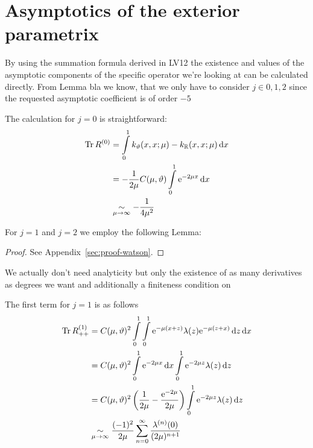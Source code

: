 \section{Asymptotics of the exterior parametrix}
By using the summation formula derived in LV12 the existence and values of the
asymptotic components of the specific operator we're looking at can be
calculated directly. From Lemma bla we know, that we only have to consider $j\in
{0, 1, 2}$ since the requested asymptotic coefficient is of order $-5$ %

The calculation for $j=0$ is straightforward:
\begin{align}
    \Tr R^{(0)} &= \Integ[1]{0}{x}{k_\theta(x,x;\mu) - k_\mathbb{R}(x,x;\mu)} \\
    &= -\frac1{2\mu} C(\mu,\theta) \Integ[1]{0}{x}{\Eto{-2\mu x}} \\
    &\SimAs{\mu\to\infty} -\frac1{4\mu^2}
    \label{eqn:jeq0}
\end{align}

For $j=1$ and $j=2$ we employ the following Lemma:
\begin{Lemma}[Watson]
    
    \begin{proof}
        See Appendix~\ref{sec:proof-watson}.
    \end{proof}
    \begin{Remark}
        We actually don't need analyticity but only the existence of as many
        derivatives as degrees we want and additionally a finiteness condition
        on
    \end{Remark}
\end{Lemma}

The first term for $j=1$ is as follows
\begin{align*}
    \Tr R^{(1)}_{++} &= C(\mu,\theta)^2
        \Integ[1]{0}{x}{
            \Integ[1]{0}{z}{\Eto{-\mu(x+z)}
                \lambda(z)\Eto{-\mu(z+x)}
            }
        }
        \\
        &= C(\mu,\theta)^2
            \Integ[1]{0}{x}{
                \Eto{-2\mu x}
            }
            \Integ[1]{0}{z}{\Eto{-2\mu z}\lambda(z)}
        \\
        &= C(\mu, \theta)^2 \left(
            \frac1{2\mu} - \frac{\Eto{-2\mu}}{2\mu}
           \right)
           \Integ[1]{0}{z}{\Eto{-2\mu z}\lambda(z)}
        \\
        &\SimAs{\mu\to\infty}
            \frac{(-1)^2}{2\mu}
            \sum_{n=0}^{\infty}\frac{\lambda^{(n)}(0)}{(2\mu)^{n+1}}
\end{align*}

